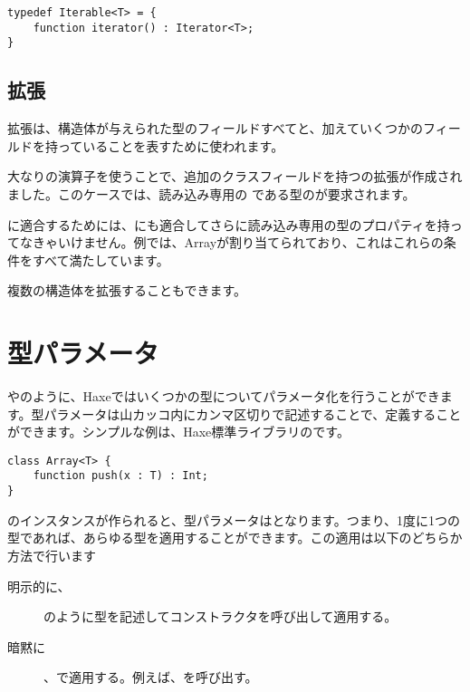 \begin{lstlisting}
typedef Iterable<T> = {
	function iterator() : Iterator<T>;
}
\end{lstlisting}

\subsection{拡張}
\label{type-system-extensions}


拡張は、構造体が与えられた型のフィールドすべてと、加えていくつかのフィールドを持っていることを表すために使われます。

大なりの演算子を使うことで、追加のクラスフィールドを持つの拡張が作成されました。このケースでは、読み込み専用の である型のが要求されます。 

に適合するためには、にも適合してさらに読み込み専用の型のプロパティを持ってなきゃいけません。例では、Arrayが割り当てられており、これはこれらの条件をすべて満たしています。

複数の構造体を拡張することもできます。


\section{型パラメータ}
\label{type-system-type-parameters}

やのように、Haxeではいくつかの型についてパラメータ化を行うことができます。型パラメータは山カッコ\expr{$<>$}内にカンマ区切りで記述することで、定義することができます。シンプルな例は、Haxe標準ライブラリのです。

\begin{lstlisting}
class Array<T> {
	function push(x : T) : Int;
}
\end{lstlisting}
のインスタンスが作られると、型パラメータはとなります。つまり、1度に1つの型であれば、あらゆる型を適用することができます。この適用は以下のどちらか方法で行います

\begin{description}
	\item[明示的に、]のように型を記述してコンストラクタを呼び出して適用する。
	\item[暗黙に]、で適用する。例えば、を呼び出す。
\end{description}

